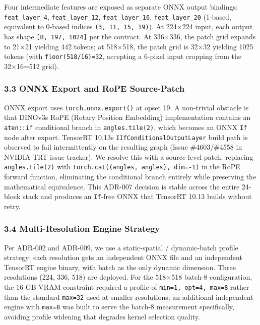 \documentclass[
]{article}
\begin{document}
Four intermediate features are exposed as separate ONNX output bindings:
\texttt{feat\_layer\_4}, \texttt{feat\_layer\_12},
\texttt{feat\_layer\_16}, \texttt{feat\_layer\_20} (1-based, equivalent
to 0-based indices \texttt{(3,\ 11,\ 15,\ 19)}). At 224×224 input, each
output has shape \texttt{{[}B,\ 197,\ 1024{]}} per the contract. At
336×336, the patch grid expands to 21×21 yielding 442 tokens; at
518×518, the patch grid is 32×32 yielding 1025 tokens (with
\texttt{floor(518/16)=32}, accepting a 6-pixel input cropping from the
32×16=512 grid).

\subsubsection{3.3 ONNX Export and RoPE
Source-Patch}\label{33-onnx-export-and-rope-source-patch}

ONNX export uses \texttt{torch.onnx.export()} at opset 19. A non-trivial
obstacle is that DINOv3\textquotesingle s RoPE (Rotary Position
Embedding) implementation contains an \texttt{aten::if} conditional
branch in \texttt{angles.tile(2)}, which becomes an ONNX \texttt{If}
node after export. TensorRT 10.13\textquotesingle s
\texttt{IIfConditionalOutputLayer} build path is observed to fail
intermittently on the resulting graph (Issue \#4603/\#4558 in NVIDIA TRT
issue tracker). We resolve this with a source-level patch: replacing
\texttt{angles.tile(2)} with
\texttt{torch.cat((angles,\ angles),\ dim=-1)} in the RoPE forward
function, eliminating the conditional branch entirely while preserving
the mathematical equivalence. This ADR-007 decision is stable across the
entire 24-block stack and produces an \texttt{If}-free ONNX that
TensorRT 10.13 builds without retry.

\subsubsection{3.4 Multi-Resolution Engine
Strategy}\label{34-multi-resolution-engine-strategy}

Per ADR-002 and ADR-009, we use a static-spatial / dynamic-batch profile
strategy: each resolution gets an independent ONNX file and an
independent TensorRT engine binary, with batch as the only dynamic
dimension. Three resolutions (224, 336, 518) are deployed. For the
518×518 batch-8 configuration, the 16 GB VRAM constraint required a
profile of \texttt{min=1,\ opt=4,\ max=8} rather than the standard
\texttt{max=32} used at smaller resolutions; an additional independent
engine with \texttt{max=8} was built to serve the batch-8 measurement
specifically, avoiding profile widening that degrades kernel selection
quality.
\end{document}
